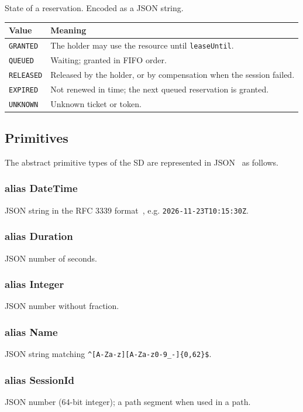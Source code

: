 \documentclass[a4paper]{arrowhead}
\newcommand{\pdef}[1]{{\textcolor{ArrowheadGrey}{#1\label{sec:model:primitives:#1}\label{sec:model:primitives:#1s}}}}
\begin{document}
State of a reservation.
 Encoded as a JSON string.
{\small
\begin{longtable}{|p{3.9cm}|p{11.9cm}|}

\hline
\rowcolor{gray!33} Value & Meaning \\ \hline
\endhead
\texttt{GRANTED} & The holder may use the resource until \texttt{leaseUntil}. \\ \hline
\texttt{QUEUED} & Waiting; granted in FIFO order. \\ \hline
\texttt{RELEASED} & Released by the holder, or by compensation when the session failed. \\ \hline
\texttt{EXPIRED} & Not renewed in time; the next queued reservation is granted. \\ \hline
\texttt{UNKNOWN} & Unknown ticket or token. \\ \hline
\end{longtable}
}


\subsection{Primitives}
\label{sec:model:primitives}
The abstract primitive types of the SD are represented in JSON~\cite{rfc8259} as follows.
\subsubsection*{alias \pdef{DateTime}}
JSON string in the RFC 3339 format~\cite{rfc3339}, e.g. \texttt{2026-\allowbreak{}11-\allowbreak{}23T10:15:30Z}.

\subsubsection*{alias \pdef{Duration}}
JSON number of seconds.

\subsubsection*{alias \pdef{Integer}}
JSON number without fraction.

\subsubsection*{alias \pdef{Name}}
JSON string matching \texttt{\^{}[A-Za-z][A-Za-z0-9\_-]\{0,62\}\$}.

\subsubsection*{alias \pdef{SessionId}}
JSON number (64-bit integer); a path segment when used in a path.
\end{document}

